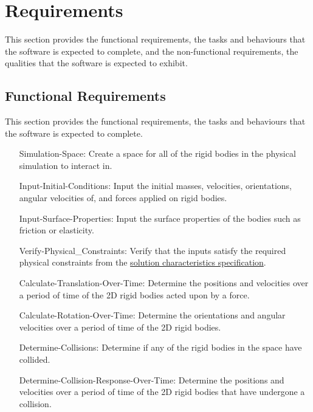 \documentclass[12pt]{article}
\begin{document}
\section{Requirements}
\label{Sec:Requirements}
This section provides the functional requirements, the tasks and behaviours that the software is expected to complete, and the non-functional requirements, the qualities that the software is expected to exhibit.

\subsection{Functional Requirements}
\label{Sec:FRs}
This section provides the functional requirements, the tasks and behaviours that the software is expected to complete.

\begin{itemize}
\item[Simulation-Space:\phantomsection\label{simSpace}]{Create a space for all of the rigid bodies in the physical simulation to interact in.}
\item[Input-Initial-Conditions:\phantomsection\label{inputInitialConds}]{Input the initial masses, velocities, orientations, angular velocities of, and forces applied on rigid bodies.}
\item[Input-Surface-Properties:\phantomsection\label{inputSurfaceProps}]{Input the surface properties of the bodies such as friction or elasticity.}
\item[Verify-Physical\_Constraints:\phantomsection\label{verifyPhysCons}]{Verify that the inputs satisfy the required physical constraints from the \hyperref[Sec:SolCharSpec]{solution characteristics specification}.}
\item[Calculate-Translation-Over-Time:\phantomsection\label{calcTransOverTime}]{Determine the positions and velocities over a period of time of the 2D rigid bodies acted upon by a force.}
\item[Calculate-Rotation-Over-Time:\phantomsection\label{calcRotOverTime}]{Determine the orientations and angular velocities over a period of time of the 2D rigid bodies.}
\item[Determine-Collisions:\phantomsection\label{deterColls}]{Determine if any of the rigid bodies in the space have collided.}
\item[Determine-Collision-Response-Over-Time:\phantomsection\label{deterCollRespOverTime}]{Determine the positions and velocities over a period of time of the 2D rigid bodies that have undergone a collision.}
\end{itemize}
\end{document}
